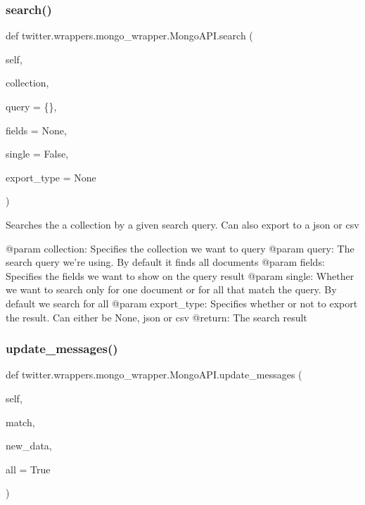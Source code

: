 \subsubsection{\texorpdfstring{search()}{search()}}
{\footnotesize\ttfamily def twitter.\+wrappers.\+mongo\+\_\+wrapper.\+Mongo\+A\+P\+I.\+search (\begin{DoxyParamCaption}\item[{}]{self,  }\item[{}]{collection,  }\item[{}]{query = {\ttfamily \{\}},  }\item[{}]{fields = {\ttfamily None},  }\item[{}]{single = {\ttfamily False},  }\item[{}]{export\+\_\+type = {\ttfamily None} }\end{DoxyParamCaption})}

\begin{DoxyVerb}Searches the a collection by a given search query. Can also export to a json or csv

@param collection: Specifies the collection we want to query
@param query: The search query we're using. By default it finds all documents
@param fields: Specifies the fields we want to show on the query result
@param single: Whether we want to search only for one document or for all that match the query. By default
we search for all
@param export_type: Specifies whether or not to export the result. Can either be None, json or csv
@return: The search result
\end{DoxyVerb}
 \mbox{\label{classtwitter_1_1wrappers_1_1mongo__wrapper_1_1MongoAPI_a731dfdca8eac58b3b2b052e0a28bffcd}} 
\subsubsection{\texorpdfstring{update\+\_\+messages()}{update\_messages()}}
{\footnotesize\ttfamily def twitter.\+wrappers.\+mongo\+\_\+wrapper.\+Mongo\+A\+P\+I.\+update\+\_\+messages (\begin{DoxyParamCaption}\item[{}]{self,  }\item[{}]{match,  }\item[{}]{new\+\_\+data,  }\item[{}]{all = {\ttfamily True} }\end{DoxyParamCaption})}

